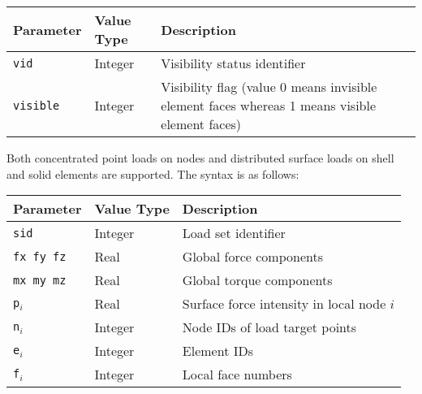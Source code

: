 
\noindent
\begin{tabular}{ | m{} | m{} | m{} |}
  \hline
  \rowcolor[HTML]{EFEFEF}
  Parameter     & Value Type & Description \\
  \hline\hline
  {\tt vid}     & Integer & Visibility status identifier \\
  \hline
  {\tt visible} & Integer & Visibility flag (value 0 means invisible element
                            faces whereas 1 means visible element faces) \\
  \hline
\end{tabular}

\clearpage



Both concentrated point loads on nodes and distributed surface loads on shell
and solid elements are supported. The  syntax is as follows:


\medskip\noindent
\begin{tabular}{| m{} | m{} | m{} |}
  \hline
  \rowcolor[HTML]{EFEFEF}
  Parameter & Value Type & Description \\
  \hline\hline
  {\tt sid}   & Integer & Load set identifier \\
  \hline
  {\tt fx fy fz} & Real & Global force components \\
  \hline
  {\tt mx my mz} & Real & Global torque components \\
  \hline
  {\tt p$_i$} & Real    & Surface force intensity in local node $i$ \\
  \hline
  {\tt n$_i$} & Integer & Node IDs of load target points \\
  \hline
  {\tt e$_i$} & Integer & Element IDs \\
  \hline
  {\tt f$_i$} & Integer & Local face numbers \\
  \hline
\end{tabular}


